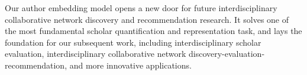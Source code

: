 \documentclass[conference]{IEEEtran}
\begin{document}
Our author embedding model opens a new door for future interdisciplinary
collaborative network discovery and recommendation research. It solves
one of the most fundamental scholar quantification and representation task,
and lays the foundation for our subsequent work, including
interdisciplinary scholar evaluation, interdisciplinary collaborative
network discovery-evaluation-recommendation, and more innovative applications.



\end{document}
